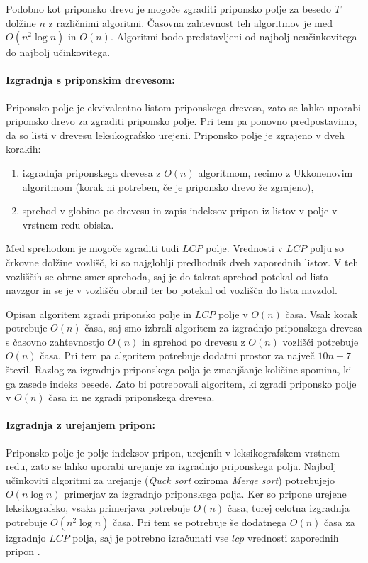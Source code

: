 Podobno kot priponsko drevo je mogoče zgraditi priponsko polje za besedo $T$ dolžine $n$ z različnimi algoritmi. Časovna zahtevnost teh algoritmov je med $O(n^2\log{n})$ in $O(n)$. Algoritmi bodo predstavljeni od najbolj neučinkovitega do najbolj učinkovitega.

\paragraph{Izgradnja s priponskim drevesom:}
Priponsko polje je ekvivalentno listom priponskega drevesa, zato se lahko uporabi priponsko drevo za zgraditi priponsko polje. Pri tem pa ponovno predpostavimo, da so listi v drevesu leksikografsko urejeni. Priponsko polje je zgrajeno v dveh korakih:

\begin{enumerate}
    \item izgradnja priponskega drevesa z $O(n)$ algoritmom, recimo z Ukkonenovim algoritmom (korak ni potreben, če je priponsko drevo že zgrajeno),
    \item sprehod v globino po drevesu in zapis indeksov pripon iz listov v polje v vrstnem redu obiska. %
\end{enumerate}
Med sprehodom je mogoče zgraditi tudi $LCP$ polje. Vrednosti v $LCP$ polju so črkovne dolžine vozlišč, ki so najgloblji predhodnik dveh zaporednih listov. V teh vozliščih se obrne smer sprehoda, saj je do takrat sprehod potekal od lista navzgor in se je v vozlišču obrnil ter bo potekal od vozlišča do lista navzdol.

Opisan algoritem zgradi priponsko polje in $LCP$ polje v $O(n)$ časa. Vsak korak potrebuje $O(n)$ časa, saj smo izbrali algoritem za izgradnjo priponskega drevesa s časovno zahtevnostjo $O(n)$ in sprehod po drevesu z $O(n)$ vozlišči potrebuje $O(n)$ časa. Pri tem pa algoritem potrebuje dodatni prostor za največ $10n-7$ števil. Razlog za izgradnjo priponskega polja je zmanjšanje količine spomina, ki ga zasede indeks besede. Zato bi potrebovali algoritem, ki zgradi priponsko polje v $O(n)$ časa in ne zgradi priponskega drevesa.

\paragraph{Izgradnja z urejanjem pripon:}
Priponsko polje je polje indeksov pripon, urejenih v leksikografskem vrstnem redu, zato se lahko uporabi urejanje za izgradnjo priponskega polja. Najbolj učinkoviti algoritmi za urejanje (\textit{Quck sort} oziroma \textit{Merge sort}) potrebujejo $O(n\log{n})$ primerjav za izgradnjo priponskega polja. Ker so pripone urejene leksikografsko, vsaka primerjava potrebuje $O(n)$ časa, torej celotna izgradnja potrebuje $O(n^2\log{n})$ časa. Pri tem se potrebuje še dodatnega $O(n)$ časa za izgradnjo $LCP$ polja, saj je potrebno izračunati vse $lcp$ vrednosti zaporednih pripon \cite{Kasai2001}.

